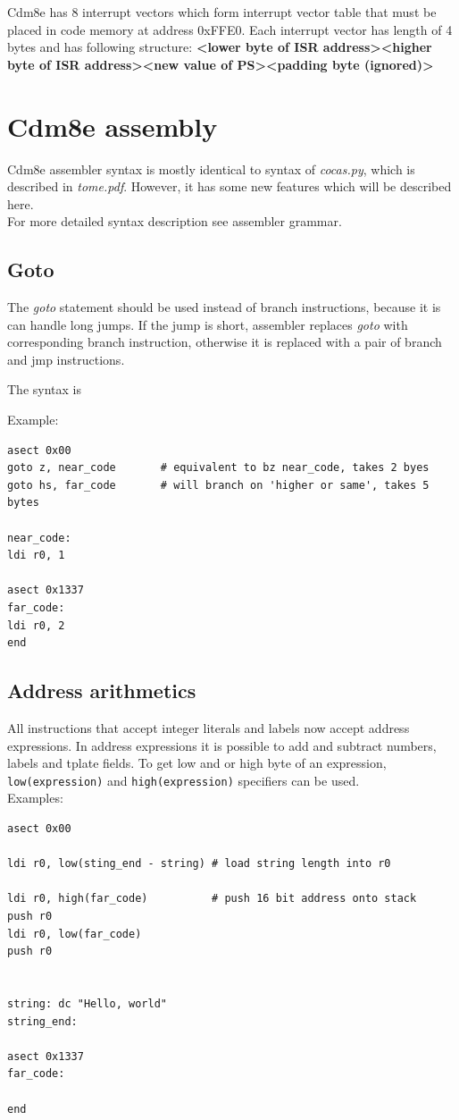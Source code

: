 \documentclass{ol-softwaremanual}
\begin{document}
    Cdm8e has 8 interrupt vectors which form interrupt vector table that must be placed in code memory at address 0xFFE0.
    Each interrupt vector has length of 4 bytes and has following structure: \textbf{<lower byte of ISR address><higher byte of ISR address><new value of PS><padding byte (ignored)>}

    \section{Cdm8e assembly}
    Cdm8e assembler syntax is mostly identical to syntax of \emph{cocas.py}, which is described in \emph{tome.pdf}.
    However, it has some new features which will be described here.\\

    For more detailed syntax description see assembler grammar.
    \subsection{Goto}
    The \emph{goto} statement should be used instead of branch instructions, because it is can handle long jumps.
    If the jump is short, assembler replaces \emph{goto} with corresponding branch instruction, otherwise it is replaced
    with a pair of branch and jmp instructions.

    The syntax is 



    Example:
    \begin{verbatim}
asect 0x00
goto z, near_code       # equivalent to bz near_code, takes 2 byes
goto hs, far_code       # will branch on 'higher or same', takes 5 bytes

near_code:
ldi r0, 1

asect 0x1337
far_code:
ldi r0, 2
end
    \end{verbatim}

    \subsection{Address arithmetics}
    All instructions that accept integer literals and labels now accept address expressions.
    In address expressions it is possible to add and subtract numbers, labels and tplate fields.
    To get low and or high byte of an expression, \texttt{low(expression)} and \texttt{high(expression)} specifiers can be used.\\
    Examples:
    \begin{verbatim}
asect 0x00

ldi r0, low(sting_end - string) # load string length into r0

ldi r0, high(far_code)          # push 16 bit address onto stack
push r0
ldi r0, low(far_code)
push r0


string: dc "Hello, world"
string_end:

asect 0x1337
far_code:

end
    \end{verbatim}
\end{document}
